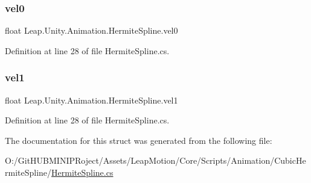 \subsubsection{\texorpdfstring{vel0}{vel0}}
{\footnotesize\ttfamily float Leap.\+Unity.\+Animation.\+Hermite\+Spline.\+vel0}



Definition at line 28 of file Hermite\+Spline.\+cs.

\mbox{\label{struct_leap_1_1_unity_1_1_animation_1_1_hermite_spline_a99576b3c8cd67280f5ec30a1e2555c9b}} 
\subsubsection{\texorpdfstring{vel1}{vel1}}
{\footnotesize\ttfamily float Leap.\+Unity.\+Animation.\+Hermite\+Spline.\+vel1}



Definition at line 28 of file Hermite\+Spline.\+cs.



The documentation for this struct was generated from the following file\+:\begin{DoxyCompactItemize}
\item 
O\+:/\+Git\+H\+U\+B\+M\+I\+N\+I\+P\+Roject/\+Assets/\+Leap\+Motion/\+Core/\+Scripts/\+Animation/\+Cubic\+Hermite\+Spline/\mbox{\hyperlink{_hermite_spline_8cs}{Hermite\+Spline.\+cs}}\end{DoxyCompactItemize}
